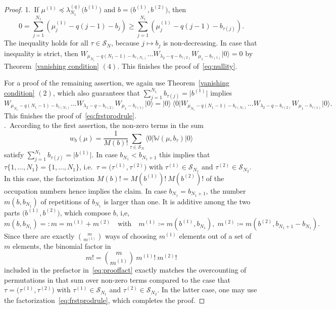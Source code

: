 \documentclass[letterpaper, DIV=17]{scrartcl}
\numberwithin{equation}{section}
\theoremstyle{definition}
\begin{document}
\begin{proof}
1.~If $ \mu^{(1)}\preceq \lambda^{(q)}_{N_1}\big(b^{(1)}\big)$ and $b = \big(b^{(1)},b^{(2)}\big) $, then 
$$
0 = \sum_{j=1}^{N_1} \left(  \mu_j^{(1)} - q(j-1) -b_j\right) \geq \sum_{j=1}^{N_1} \left(  \mu_j^{(1)} - q(j-1) -b_{\tau(j)} \right) .
$$ 
The inequality holds for all $   \tau \in \mathcal{S}_N  $, because $ j \mapsto b_j $ is non-decreasing.  In case that inequality is strict, then $ W_{\mu_{N_1}-q(N_1-1)-b_{\tau(N_1)}} \dots W_{\lambda_2 - q-b_{\tau(2)} }W_{\mu_1-b_{\tau(1)}} \vert 0\rangle= 0 $ by Theorem~\ref{vanishing condition} $(4)$. This finishes the proof of~\eqref{eq:nullity}. 

For a proof of the remaining assertion, we again use Theorem~\ref{vanishing condition} $(2)$, which also guarantees that $ \sum_{j=1}^{N_1} b_{\tau(j)} =  \vert b^{(1)} \vert $ implies
$$
 W_{\mu_{N_1}-q(N_1-1)-b_{\tau(N_1)}} \dots W_{\lambda_2 - q-b_{\tau(2)}} W_{\mu_1-b_{\tau(1)}} \vert 0 \rangle     =  \vert 0 \rangle \  \langle 0 \vert W_{\mu_{N_1}-q(N_1-1)-b_{\tau(N_1)}} \dots W_{\lambda_2 - q-b_{\tau(2)}} W_{\mu_1-b_{\tau(1)}} \vert 0 \rangle .
$$
This finishes the proof of~\eqref{eq:frstprodrule}. \\
.~According to the first assertion, the non-zero terms in the sum
\begin{equation}\label{eq:prooffact}
 w_b(\mu) = \frac{1}{M(b)!} \sum_{\tau \in  \mathcal{S}_{N}} \langle 0 \vert \mathbb{W}(\mu,b_\tau) \vert 0 \rangle
\end{equation}
satisfy $ \sum_{j=1}^{N_1} b_{\tau(j)} =  \vert b^{(1)} \vert $. In case $ b_{N_1} < b_{N_1+1} $ this implies that $ \tau\{1,\dots, N_1\} = \{1,\dots, N_1\}  $, i.e.\ $ \tau = \big(\tau^{(1)}, \tau^{(2)} \big) $ with $ \tau^{(1)} \in \mathcal{S}_{N_1} $ and $  \tau^{(2)} \in \mathcal{S}_{N_2} $. In this case, the factorization $ M(b)! = M(b^{(1)})! \ M(b^{(2)})! $ of the occupation numbers hence implies the claim. 
In case $ b_{N_1} = b_{N_1+1} $, the number $ m(b,b_{N_1}) $ of repetitions of $ b_{N_1} $ is larger than one. It is additive among the two parts $  \big(b^{(1)},b^{(2)}\big) $, which compose $ b $, i,e,
$$
m(b,b_{N_1}) =:  m  = m^{(1)} + m^{(2)} \quad \mbox{with} \quad m^{(1)} \coloneqq m(b^{(1)},b_{N_1}) , \;  m^{(2)} \coloneqq m(b^{(2)}, b_{N_1+1}  - b_{N_1}) . 
$$
Since there are exactly $ \binom{m}{m^{(1)}} $ ways of choosing $ m^{(1)} $ elements out of a set of $ m $ elements, the binomial factor in 
$$ m! =   \binom{m}{m^{(1)}}\ m^{(1)} ! \  m^{(2)} ! $$ 
included in the prefactor in~\eqref{eq:prooffact} exactly matches the overcounting of permutations in that sum over non-zero terms compared to the case that $ \tau =  \big(\tau^{(1)}, \tau^{(2)} \big) $ with $ \tau^{(1)} \in \mathcal{S}_{N_1} $ and $  \tau^{(2)} \in \mathcal{S}_{N_2} $. In the latter case, one may use the factorization~\eqref{eq:frstprodrule}, which completes the proof. 
\end{proof}
		
\end{document}
